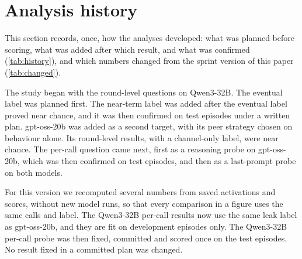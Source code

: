 \section{Analysis history}
\label{app:history}

This section records, once, how the analyses developed: what was planned before scoring, what was added after which result, and what was confirmed (\cref{tab:history}), and which numbers changed from the sprint version of this paper (\cref{tab:changed}).

The study began with the round-level questions on Qwen3-32B.
The eventual label was planned first.
The near-term label was added after the eventual label proved near chance, and it was then confirmed on test episodes under a written plan.
gpt-oss-20b was added as a second target, with its peer strategy chosen on behaviour alone.
Its round-level results, with a channel-only label, were near chance.
The per-call question came next, first as a reasoning probe on gpt-oss-20b, which was then confirmed on test episodes, and then as a last-prompt probe on both models.

For this version we recomputed several numbers from saved activations and scores, without new model runs, so that every comparison in a figure uses the same calls and label.
The Qwen3-32B per-call results now use the same leak label as gpt-oss-20b, and they are fit on development episodes only.
The Qwen3-32B per-call probe was then fixed, committed and scored once on the test episodes.
No result fixed in a committed plan was changed.

\begin{table}[h]
  \centering
  \small
  
  \caption{Analysis history. ``Planned'' means fixed in a committed plan before any detector's predictions were compared with the labels; the table gives each plan's timing relative to collection.}
  \label{tab:history}
\end{table}

\begin{table}[h]
  \centering
  \small
  
  \caption{Numbers that changed from the sprint version, and why.}
  \label{tab:changed}
\end{table}
